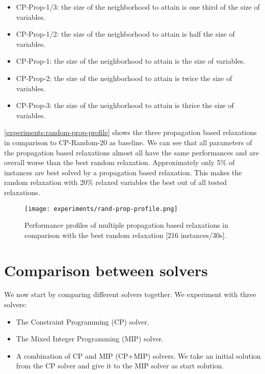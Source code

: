 \documentclass[../../thesis.tex]{subfiles}
\begin{document}
\begin{itemize}
  \item CP-Prop-1/3: the size of the neighborhood to attain is one third of the size of variables.
  \item CP-Prop-1/2: the size of the neighborhood to attain is half the size of variables.
  \item CP-Prop-1: the size of the neighborhood to attain is the size of variables.
  \item CP-Prop-2: the size of the neighborhood to attain is twice the size of variables.
  \item CP-Prop-3: the size of the neighborhood to attain is thrice the size of variables.
\end{itemize}

\autoref{experiments:random-prop-profile} shows the three propagation based relaxations in comparison to CP-Random-20 as baseline.
We can see that all parameters of the propagation based relaxations almost all have the same performances and 
are overall worse than the best random relaxation. Approximately only 5\% of instances are best solved by a propagation based 
relaxation. This makes the random relaxation with 20\% relaxed variables the best out of all tested relaxations.

\begin{figure}
  \centering
  \texttt{[image: experiments/rand-prop-profile.png]}
  \caption{Performance profiles of multiple propagation based relaxations in comparison with the best random relaxation [216 instances/30s].}
  \label{experiments:random-prop-profile}
\end{figure}


\section{Comparison between solvers}

We now start by comparing different solvers together. We experiment with three solvers: 

\begin{itemize}
  \item The Constraint Programming (CP) solver.
  \item The Mixed Integer Programming (MIP) solver.
  \item A combination of CP and MIP (CP+MIP) solvers. We take an initial solution from the CP solver 
  and give it to the MIP solver as start solution. 
\end{itemize}
\end{document}
